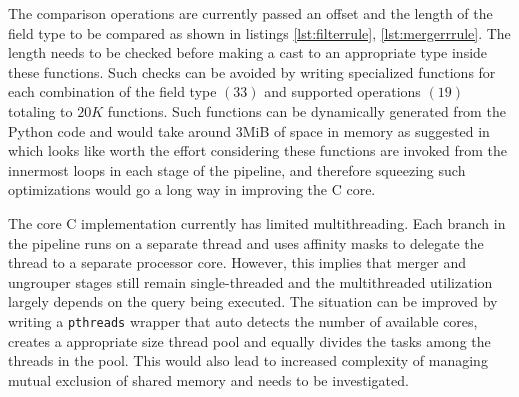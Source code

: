 The comparison operations are currently passed an offset and the length of the
field type to be compared as shown in listings \ref{lst:filterrule},
\ref{lst:mergerrrule}. The length needs to be checked before making a cast to
an appropriate type inside these functions. Such checks can be avoided by
writing specialized functions for each combination of the field type $(33)$
and supported  operations
$(19)$ totaling to $20K$ functions. Such functions can be dynamically
generated from the Python code and would take around $3$MiB of space in memory
as suggested in \cite{jschauer:thesis:2011} which looks like worth the effort
considering these functions are invoked from the innermost loops in each stage
of the pipeline, and therefore squeezing such optimizations would go a long
way in improving the C core.

The core C implementation currently has limited multithreading. Each branch in
the pipeline runs on a separate thread and uses affinity masks to delegate the
thread to a separate processor core. However, this implies that merger and
ungrouper stages still remain single-threaded and the multithreaded
utilization largely depends on  the query
being executed. The situation can be improved by writing a \texttt{pthreads}
wrapper that auto detects the number of available cores, creates a appropriate
size thread pool and equally divides the tasks among the threads in the pool.
This would also lead to increased complexity of managing mutual exclusion of
shared memory and needs to be investigated.
